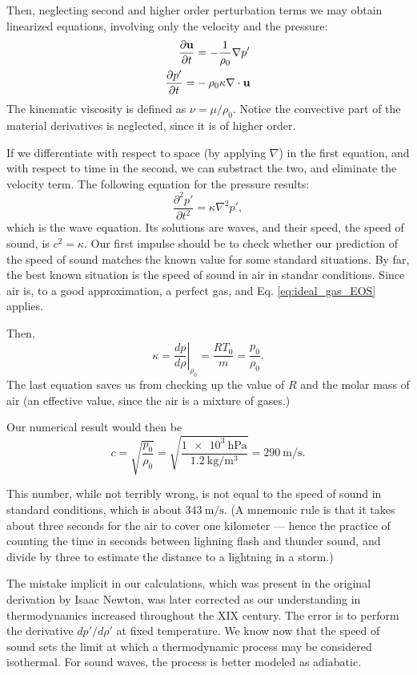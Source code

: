 Then, neglecting second and higher order perturbation terms we may
obtain linearized equations, involving only the velocity and the
pressure:
\begin{align}
  \label{eq:sound_lin_cont}
  \frac{\partial \mathbf{u} }{\partial t} & = - \frac{1}{\rho_0} \nabla p' \\
  \frac{\partial p'}{\partial t} = & - \rho_0 \kappa \nabla \cdot \mathbf{u}
\end{align}
The kinematic viscosity is defined as $ \nu=\mu/\rho_0$.%
Notice the convective part of the material derivatives is neglected,
since it is of higher order.

If we differentiate with respect to space (by applying $ \nabla$) in
the first equation, and with respect to time in the second, we can
substract the two, and eliminate the velocity term. 
The following equation for the pressure results:
\[
\frac{\partial^2 p' }{\partial t^2 }  = \kappa \nabla^2 p' ,
\]
which is the wave equation. Its solutions are waves, and their speed,
the speed of sound, is $c^2 = \kappa $. Our first impulse should be to
check whether our prediction of the speed of sound matches the known
value for some standard situations. By far, the best known situation
is the speed of sound in air in standar conditions. Since air is, to a
good approximation, a perfect gas, and Eq. \ref{eq:ideal_gas_EOS}
applies.

Then,
\[
\kappa =  \left. \frac{d p}{d\rho} \right|_{\rho_0} =
 \frac{ R T_0}{m} = \frac{ p_0 }{ \rho_0 } .
\]
The last equation saves us from checking up the value of $R$ and the
molar mass of air (an effective value, since the air is a mixture of
gases.)

Our numerical result would then be
\[
c= \sqrt{\frac{ p_0 }{ \rho_0 }} =
\sqrt{\frac%
  { \SI{1e3}{\hecto\pascal} }%
  {\SI{1.2}{\kilo\gram\per\meter\cubed}}} =
\SI{290}{\meter\per\second} .
\]

This number, while not terribly wrong, is not equal to the speed of
sound in standard conditions, which is about
$\SI{343}{\meter\per\second}$. (A mnemonic rule is that it takes about
three seconds for the air to cover one kilometer --- hence the
practice of counting the time in seconds between lighning flash and
thunder sound, and divide by three to estimate the distance to a
lightning in a storm.)

The mistake implicit in our calculations, which was present in the
original derivation by Isaac Newton, was later corrected as our
understanding in thermodynamics increased throughout the XIX
century. The error is to perform the derivative $d p' / d\rho'$ at
fixed temperature. We know now that the speed of sound sets the limit
at which a thermodynamic process may be considered isothermal. For
sound waves, the process is better modeled as
adiabatic.


